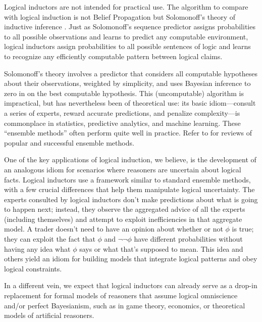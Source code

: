\documentclass[authordate,onecolumn,noenvironments]{miri-tech-article}
\numberwithin{equation}{subsection}
\begin{document}
Logical inductors are not intended for practical use. The algorithm to compare with logical induction is not Belief Propagation  but Solomonoff's theory of inductive inference . Just as Solomonoff's sequence predictor assigns probabilities to all possible observations and learns to predict any computable environment, logical inductors assign probabilities to all possible sentences of logic and learns to recognize any efficiently computable pattern between logical claims.

Solomonoff's theory involves a predictor that considers all computable hypotheses about their observations, weighted by simplicity, and uses Bayesian inference to zero in on the best computable hypothesis. This (uncomputable) algorithm is impractical, but has nevertheless been of theoretical use: its basic idiom---consult a series of experts, reward accurate predictions, and penalize complexity---is commonplace in statistics, predictive analytics, and machine learning. These ``ensemble methods'' often perform quite well in practice. Refer to \citet{opitz1999popular,dietterich2000ensemble} for reviews of popular and successful ensemble methods.

One of the key applications of logical induction, we believe, is the development of an analogous idiom for scenarios where reasoners are uncertain about logical facts. Logical inductors use a framework similar to standard ensemble methods, with a few crucial differences that help them manipulate logical uncertainty. The experts consulted by logical inductors don't make predictions about what is going to happen next; instead, they observe the aggregated advice of all the experts (including themselves) and attempt to exploit inefficiencies in that aggregate model. A trader doesn't need to have an opinion about whether or not $\phi$ is true; they can exploit the fact that $\phi$ and $\lnot\lnot\phi$ have different probabilities without having any idea what $\phi$ says or what that's supposed to mean. This idea and others yield an idiom for building models that integrate logical patterns and obey logical constraints. 

In a different vein, we expect that logical inductors can already serve as a drop-in replacement for formal models of reasoners that assume logical omniscience and/or perfect Bayesianism, such as in game theory, economics, or theoretical models of artificial reasoners.
\end{document}

